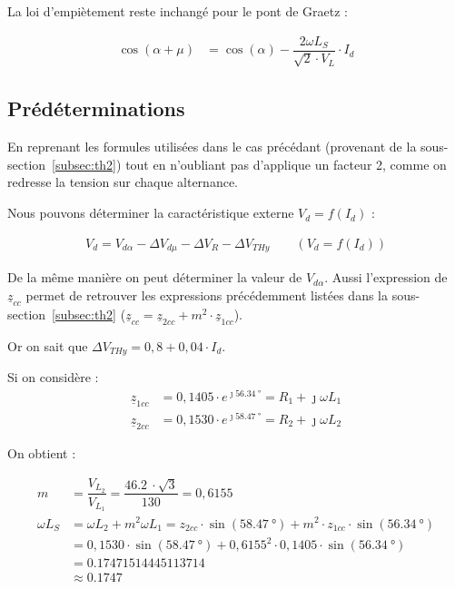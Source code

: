 \documentclass[a4paper, 11pt, openany, oneside, french]{article}
\begin{document}
La loi d'empiètement reste inchangé pour le pont de Graetz :

\begin{align*}
    \cos{\left(\alpha + \mu\right)} &= \cos{\left(\alpha \right)} - \dfrac{2 \omega L_S}{\sqrt{2} \cdot V_L} \cdot I_d
\end{align*}

\subsection{Prédéterminations}
En reprenant les formules utilisées dans le cas précédant (provenant de la sous-section~\ref{subsec:th2}) tout en n'oubliant pas d'applique un facteur 2, comme on redresse la tension sur chaque alternance.

Nous pouvons déterminer la caractéristique externe $V_d = f\left(I_d\right)$ :

\begin{align*}
    V_d = V_{d\alpha} - \Delta V_{d\mu} - \Delta V_R - \Delta V_{THy} \qquad \left(V_d = f\left(I_d\right)\right)
\end{align*}

De la même manière on peut déterminer la valeur de $V_{d\alpha}$. Aussi l'expression de $\underline{z}_{cc}$ permet de retrouver les expressions précédemment listées dans la sous-section~\ref{subsec:th2} ($\underline{z}_{cc}=\underline{z}_{2cc} + m^2 \cdot \underline{z}_{1cc}$).

Or on sait que $\Delta V_{THy} = 0,8 + 0,04 \cdot I_d$.

Si on considère :
\begin{align*}
    \underline{z}_{1cc} &= 0,1405 \cdot e^{\jmath \SI{56.34}{\degree}} = R_1 + \jmath \omega L_1\\
    \underline{z}_{2cc} &= 0,1530 \cdot e^{\jmath \SI{58.47}{\degree}} = R_2 + \jmath \omega L_2
\end{align*}

On obtient :

\begin{align*}
    m &= \dfrac{V_{L_2}}{V_{L_1}} = \dfrac{\SI{46.2}{} \cdot \sqrt{3}}{130} = 0,6155 \\
    \omega L_S &= \omega L_2 + m^2 \omega L_1 = z_{2cc} \cdot \sin{\left(\SI{58,47}{\degree}\right)} + m^2 \cdot z_{1cc} \cdot \sin{\left(\SI{56,34}{\degree}\right)}\\
    &= 0,1530 \cdot \sin{\left(\SI{58,47}{\degree}\right)} + 0,6155^2 \cdot 0,1405 \cdot \sin{\left(\SI{56,34}{\degree}\right)} \\
    &= \SI{0.17471514445113714}{} \\
    &\approx \SI{0.1747}{}
\end{align*}
\end{document}
